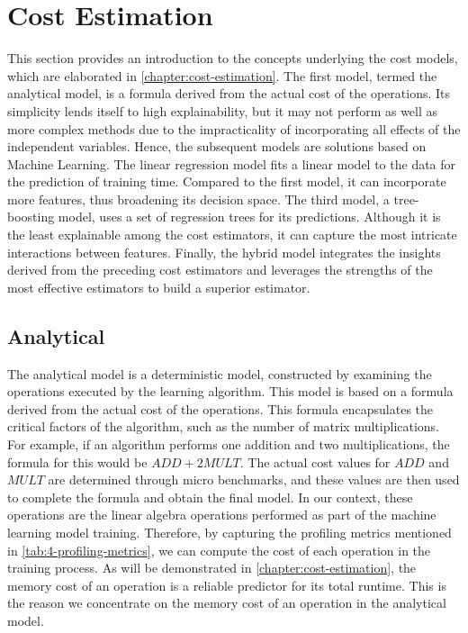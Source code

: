 \section{Cost Estimation}
\label{sec:4-cost-estimation}
This section provides an introduction to the concepts underlying the cost models, which are elaborated in \autoref{chapter:cost-estimation}. The first model, termed the analytical model, is a formula derived from the actual cost of the operations. Its simplicity lends itself to high explainability, but it may not perform as well as more complex methods due to the impracticality of incorporating all effects of the independent variables. Hence, the subsequent models are solutions based on Machine Learning. The linear regression model fits a linear model to the data for the prediction of training time. Compared to the first model, it can incorporate more features, thus broadening its decision space. The third model, a tree-boosting model, uses a set of regression trees for its predictions. Although it is the least explainable among the cost estimators, it can capture the most intricate interactions between features. Finally, the hybrid model integrates the insights derived from the preceding cost estimators and leverages the strengths of the most effective estimators to build a superior estimator.

\subsection{Analytical}
The analytical model is a deterministic model, constructed by examining the operations executed by the learning algorithm. This model is based on a formula derived from the actual cost of the operations. This formula encapsulates the critical factors of the algorithm, such as the number of matrix multiplications. For example, if an algorithm performs one addition and two multiplications, the formula for this would be $ADD + 2MULT$. The actual cost values for $ADD$ and $MULT$ are determined through micro benchmarks, and these values are then used to complete the formula and obtain the final model. In our context, these operations are the linear algebra operations performed as part of the machine learning model training. Therefore, by capturing the profiling metrics mentioned in \autoref{tab:4-profiling-metrics}, we can compute the cost of each operation in the training process. As will be demonstrated in \autoref{chapter:cost-estimation}, the memory cost of an operation is a reliable predictor for its total runtime. This is the reason we concentrate on the memory cost of an operation in the analytical model.

